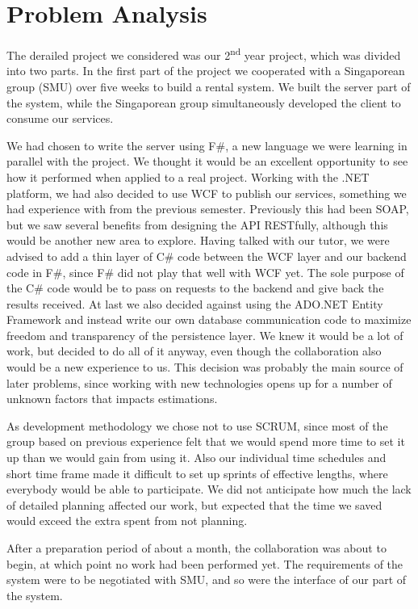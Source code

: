 \section{Problem Analysis}
The derailed project we considered was our 2\textsuperscript{nd} year project, which was divided into two parts. In the first part of the project we cooperated with a Singaporean group (SMU) over five weeks to build a rental system. We built the server part of the system, while the Singaporean group simultaneously developed the client to consume our services.

We had chosen to write the server using F\#, a new language we were learning in parallel with the project. We thought it would be an excellent opportunity to see how it performed when applied to a real project.
Working with the .NET platform, we had also decided to use WCF to publish our services, something we had experience with from the previous semester. Previously this had been SOAP, but we saw several benefits from designing the API RESTfully, although this would be another new area to explore.
Having talked with our tutor, we were advised to add a thin layer of C\# code between the WCF layer and our backend code in F\#, since F\# did not play that well with WCF yet. The sole purpose of the C\# code would be to pass on requests to the backend and give back the results received.
At last we also decided against using the ADO.NET Entity Framework and instead write our own database communication code to maximize freedom and transparency of the persistence layer.
We knew it would be a lot of work, but decided to do all of it anyway, even though the collaboration also would be a new experience to us. This decision was probably the main source of later problems, since working with new technologies opens up for a number of unknown factors that impacts estimations.

As development methodology we chose not to use SCRUM, since most of the group based on previous experience felt that we would spend more time to set it up than we would gain from using it. Also our individual time schedules and short time frame made it difficult to set up sprints of effective lengths, where everybody would be able to participate. We did not anticipate how much the lack of detailed planning affected our work, but expected that the time we saved would exceed the extra spent from not planning.

After a preparation period of about a month, the collaboration was about to begin, at which point no work had been performed yet. The requirements of the system were to be negotiated with SMU, and so were the interface of our part of the system.

